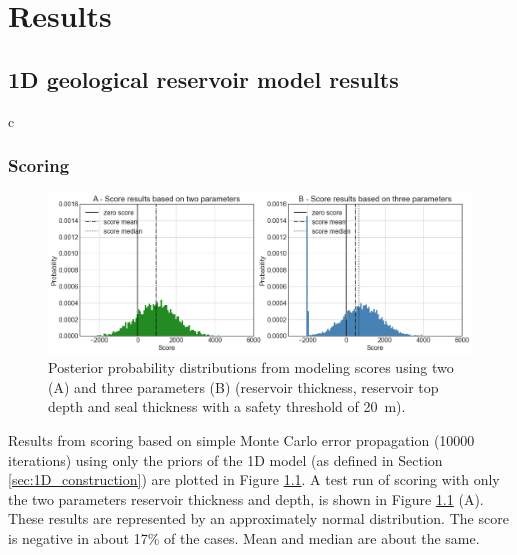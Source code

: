 	\chapter{Results}\label{cha:results}
	
		\section{1D geological reservoir model results}
	
c			\subsection{Scoring}
			\begin{figure}[h]
				\centering
				\includegraphics[width=1\textwidth]{Figures/score_results1.png}
				\caption{Posterior probability distributions from modeling scores using two (A) and three parameters (B) (reservoir thickness, reservoir top depth and seal thickness with a safety threshold of 20~m).}\label{fig:score_results1}
			\end{figure}
			Results from scoring based on simple Monte Carlo error propagation (10000 iterations) using only the priors of the 1D model (as defined in Section \ref{sec:1D_construction}) are plotted in Figure \ref{fig:score_results1}. A test run of scoring with only the two parameters reservoir thickness and depth, is shown in Figure \ref{fig:score_results1} (A). These results are represented by an approximately normal distribution. The score is negative in about 17\% of the cases. Mean and median are about the same.\\	
